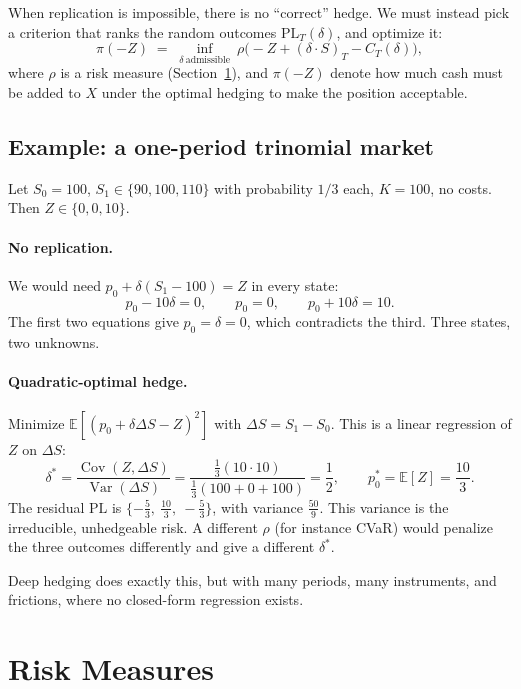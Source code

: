 \documentclass[11pt]{article}
\theoremstyle{definition}
\theoremstyle{remark}
\newcommand{\E}{\mathbb{E}}
\newcommand{\PL}{\mathrm{PL}}
\begin{document}
When replication is impossible, there is no ``correct'' hedge. We must instead pick a criterion that
ranks the random outcomes $\PL_T(\delta)$, and optimize it:
\begin{equation}\label{eq:main}
\pi(-Z)\;=\;\inf_{\delta\ \text{admissible}}\ \rho\bigl(-Z+(\delta\cdot S)_T-C_T(\delta)\bigr),
\end{equation}
where $\rho$ is a risk measure (Section~\ref{sec:risk}), and $\pi(-Z)$ denote how much cash must be added to $X$ under the optimal hedging to make the position acceptable.

\subsection{Example: a one-period trinomial market}

Let $S_0=100$, $S_1\in\{90,100,110\}$ with probability $1/3$ each, $K=100$, no costs.
Then $Z\in\{0,0,10\}$.

\paragraph{No replication.} We would need $p_0+\delta(S_1-100)=Z$ in every state:
\[
p_0-10\delta=0,\qquad p_0=0,\qquad p_0+10\delta=10 .
\]
The first two equations give $p_0=\delta=0$, which contradicts the third. Three states, two unknowns.

\paragraph{Quadratic-optimal hedge.} Minimize $\E[(p_0+\delta\Delta S-Z)^2]$ with $\Delta S=S_1-S_0$.
This is a linear regression of $Z$ on $\Delta S$:
\[
\delta^*=\frac{\operatorname{Cov}(Z,\Delta S)}{\operatorname{Var}(\Delta S)}
=\frac{\tfrac13(10\cdot 10)}{\tfrac13(100+0+100)}=\frac12,
\qquad p_0^*=\E[Z]=\frac{10}{3}.
\]
The residual $\PL$ is $\{-\tfrac53,\ \tfrac{10}{3},\ -\tfrac53\}$, with variance $\tfrac{50}{9}$.
This variance is the irreducible, unhedgeable risk. A different $\rho$ (for instance CVaR) would penalize the
three outcomes differently and give a different $\delta^*$.

Deep hedging does exactly this, but with many periods, many instruments, and frictions,
where no closed-form regression exists.

\section{Risk Measures}\label{sec:risk}
\end{document}
